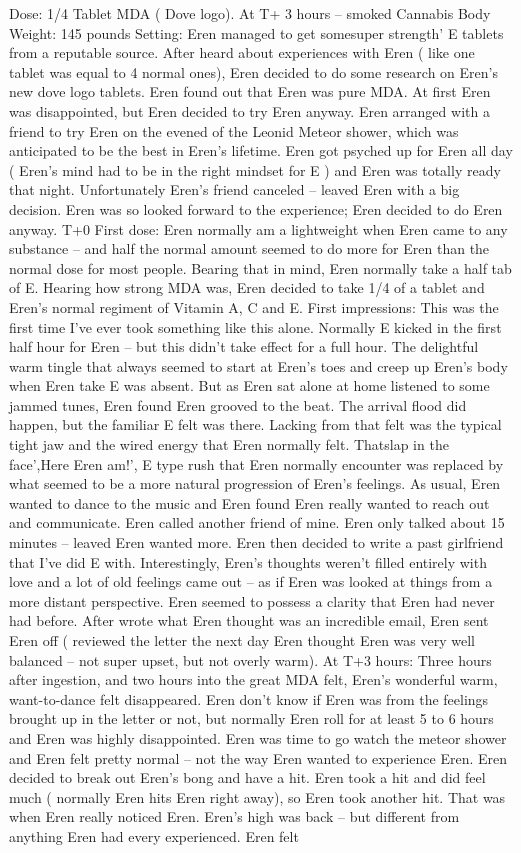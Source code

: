\documentclass[12pt]{book}
\begin{document}
Dose: 1/4 Tablet MDA ( Dove logo). At T+ 3 hours -- smoked Cannabis Body Weight: 145 pounds Setting: Eren managed to get somesuper strength' E tablets from a reputable source. After heard about experiences with Eren ( like one tablet was equal to 4 normal ones), Eren decided to do some research on Eren's new dove logo tablets. Eren found out that Eren was pure MDA. At first Eren was disappointed, but Eren decided to try Eren anyway. Eren arranged with a friend to try Eren on the evened of the Leonid Meteor shower, which was anticipated to be the best in Eren's lifetime. Eren got psyched up for Eren all day ( Eren's mind had to be in the right mindset for E ) and Eren was totally ready that night. Unfortunately Eren's friend canceled -- leaved Eren with a big decision. Eren was so looked forward to the experience; Eren decided to do Eren anyway. T+0 First dose: Eren normally am a lightweight when Eren came to any substance -- and half the normal amount seemed to do more for Eren than the normal dose for most people. Bearing that in mind, Eren normally take a half tab of E. Hearing how strong MDA was, Eren decided to take 1/4 of a tablet and Eren's normal regiment of Vitamin A, C and E. First impressions: This was the first time I've ever took something like this alone. Normally E kicked in the first half hour for Eren -- but this didn't take effect for a full hour. The delightful warm tingle that always seemed to start at Eren's toes and creep up Eren's body when Eren take E was absent. But as Eren sat alone at home listened to some jammed tunes, Eren found Eren grooved to the beat. The arrival flood did happen, but the familiar E felt was there. Lacking from that felt was the typical tight jaw and the wired energy that Eren normally felt. Thatslap in the face',Here Eren am!', E type rush that Eren normally encounter was replaced by what seemed to be a more natural progression of Eren's feelings. As usual, Eren wanted to dance to the music and Eren found Eren really wanted to reach out and communicate. Eren called another friend of mine. Eren only talked about 15 minutes -- leaved Eren wanted more. Eren then decided to write a past girlfriend that I've did E with. Interestingly, Eren's thoughts weren't filled entirely with love and a lot of old feelings came out -- as if Eren was looked at things from a more distant perspective. Eren seemed to possess a clarity that Eren had never had before. After wrote what Eren thought was an incredible email, Eren sent Eren off ( reviewed the letter the next day Eren thought Eren was very well balanced -- not super upset, but not overly warm). At T+3 hours: Three hours after ingestion, and two hours into the great MDA felt, Eren's wonderful warm, want-to-dance felt disappeared. Eren don't know if Eren was from the feelings brought up in the letter or not, but normally Eren roll for at least 5 to 6 hours and Eren was highly disappointed. Eren was time to go watch the meteor shower and Eren felt pretty normal -- not the way Eren wanted to experience Eren. Eren decided to break out Eren's bong and have a hit. Eren took a hit and did feel much ( normally Eren hits Eren right away), so Eren took another hit. That was when Eren really noticed Eren. Eren's high was back -- but different from anything Eren had every experienced. Eren felt 
\end{document}
